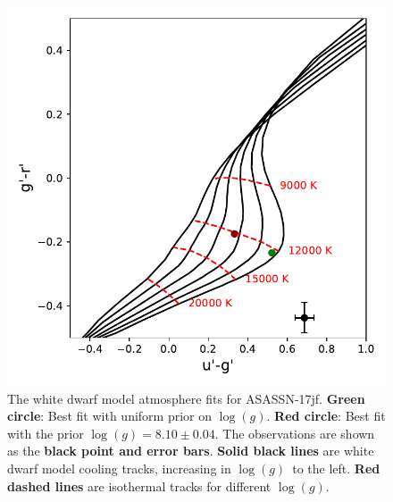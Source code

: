 \begin{figure}
    \centering
    \includegraphics[width=\columnwidth, trim={0 0mm 0 0},clip]{figures/results/three_cvs_with_weird_colours/ASASSN-17jf/PhysicalParams/ASASSN-17jf_colourPlot_alpha_beta.pdf}
    \caption{The white dwarf model atmosphere fits for ASASSN-17jf. {\bf Green circle}: Best fit with uniform prior on $\log (g)$. {\bf Red circle}: Best fit with the prior $\log(g)=8.10\pm0.04$. The observations are shown as the {\bf black point and error bars}. {\bf Solid black lines} are white dwarf model cooling tracks, increasing in $\log (g)$\ to the left. {\bf Red dashed lines} are isothermal tracks for different $\log (g)$.}
    \label{fig:ASASSN-17jf colours}
\end{figure}
